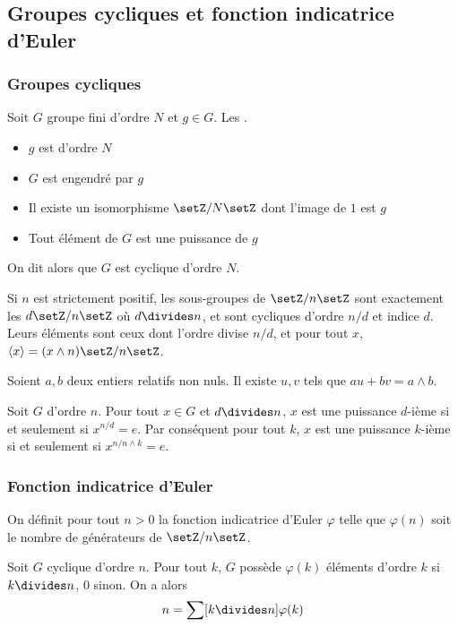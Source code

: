 \documentclass[a4paper,11pt,twocolumn]{article}\usepackage[landscape]{geometry}
\begin{document}
  \subsection{Groupes cycliques et fonction indicatrice d'Euler}

    \subsubsection{Groupes cycliques}

       Soit $G$ groupe fini d'ordre $N$ et $g\in G$. Les \Asse{}.
      \begin{itemize}
        \item $g$ est d'ordre $N$
        \item $G$ est engendré par $g$
        \item Il existe un isomorphisme $\setZ/N\setZ$ dont l'image de $1$ est $g$
        \item Tout élément de $G$ est une puissance de $g$
      \end{itemize}

      On dit alors que $G$ est cyclique d'ordre $N$.

       Si $n$ est strictement positif, les sous-groupes de $\setZ/n\setZ$ sont exactement les $d\setZ/n\setZ$ où $d\divides n$, et sont cycliques d'ordre $n/d$ et indice $d$. Leurs éléments sont ceux dont l'ordre divise $n/d$, et pour tout $x$, $\langle x\rangle = (x\wedge n)\setZ/n\setZ$.

       Soient $a,b$ deux entiers relatifs non nuls. Il existe $u,v$ tels que $au+bv=a\wedge b$.

       Soit $G$ d'ordre $n$. Pour tout $x\in G$ et $d\divides n$, $x$ est une puissance $d$-ième si et seulement si $x^{n/d} = e$. Par conséquent pour tout $k$, $x$ est une puissance $k$-ième si et seulement si $x^{n/{n\wedge k}}=e$.

    \subsubsection{Fonction indicatrice d'Euler}

       On définit pour tout $n>0$ la fonction indicatrice d'Euler $\varphi$ telle que $\varphi(n)$ soit le nombre de générateurs de $\setZ/n\setZ$.

       Soit $G$ cyclique d'ordre $n$. Pour tout $k$, $G$ possède $\varphi(k)$ éléments d'ordre $k$ si $k\divides n$, $0$ sinon. On a alors $$n = \sum[k\divides n]{\varphi(k)}$$
\end{document}
